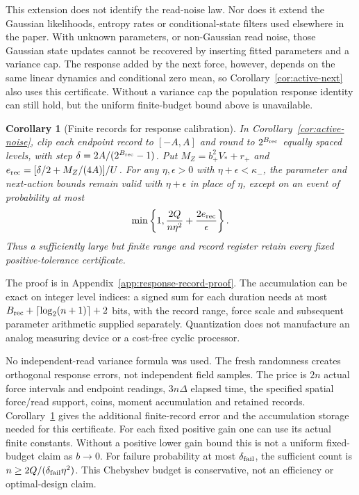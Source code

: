 \documentclass[12pt,a4paper]{article}
\newtheorem{corollary}[theorem]{Corollary}
\begin{document}
This extension does not identify the read-noise law. Nor does it extend
the Gaussian likelihoods, entropy rates or conditional-state filters
used elsewhere in the paper. With unknown parameters, or non-Gaussian
read noise, those Gaussian state updates cannot be recovered by
inserting fitted parameters and a variance cap. The response added by
the next force, however, depends on the same linear dynamics and
conditional zero mean, so Corollary~\ref{cor:active-next} also uses this
certificate. Without a variance cap the population response identity
can still hold, but the uniform finite-budget bound above is unavailable.

\begin{corollary}[Finite records for response calibration]
\label{cor:active-quantization}
In Corollary~\ref{cor:active-noise}, clip each endpoint record to
$[-A,A]$ and round to $2^{B_{\rm rec}}$ equally spaced levels, with
step $\delta=2A/(2^{B_{\rm rec}}-1)$. Put
$M_Z=b_+^2V_*+r_+$ and
$e_{\rm rec}=[\delta/2+M_Z/(4A)]/U$.
For any $\eta,\epsilon>0$ with
$\eta+\epsilon<\kappa_-$, the parameter and next-action bounds
remain valid with $\eta+\epsilon$ in place of $\eta$, except on an
event of probability at most
\[
 \min\left\{1,\frac{2Q}{n\eta^2}
                 +\frac{2e_{\rm rec}}{\epsilon}\right\}.
\]
Thus a sufficiently large but finite range and record register
retain every fixed positive-tolerance certificate.
\end{corollary}
The proof is in Appendix~\ref{app:response-record-proof}.
The accumulation can be exact on integer level indices: a signed sum
for each duration needs at most
$B_{\rm rec}+\lceil\log_2(n+1)\rceil+2$ bits, with the record range,
force scale and subsequent parameter arithmetic supplied separately.
Quantization does not manufacture an analog measuring device or
a cost-free cyclic processor.

No independent-read variance formula was used. The fresh randomness
creates orthogonal response errors, not independent field samples.
The price is $2n$ actual force intervals and endpoint readings,
$3n\Delta$ elapsed time, the specified spatial force/read support,
coins, moment accumulation and retained records. Corollary~\ref{cor:active-quantization} gives the additional finite-record
error and the accumulation storage needed for this certificate. For each fixed positive gain one can use its
actual finite constants. Without a positive lower gain bound this is
not a uniform fixed-budget claim as $b\to0$.
For failure probability at most $\delta_{\rm fail}$, the sufficient
count is $n\ge2Q/(\delta_{\rm fail}\eta^2)$. This Chebyshev budget
is conservative, not an efficiency or optimal-design claim.
\end{document}
